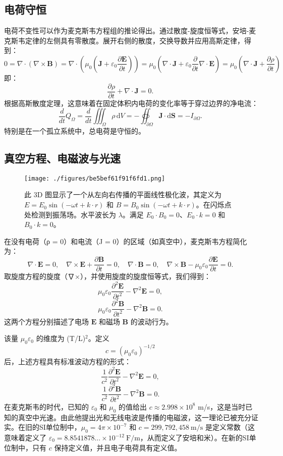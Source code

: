 \subsection{电荷守恒}
电荷不变性可以作为麦克斯韦方程组的推论得出。通过散度-旋度恒等式，安培-麦克斯韦定律的左侧具有零散度。展开右侧的散度，交换导数并应用高斯定律，得到：
\[ 0 = \nabla \cdot (\nabla \times \mathbf{B}) = \nabla \cdot \left(\mu_{0} \left(\mathbf{J} + \varepsilon_{0} \frac{\partial \mathbf{E}}{\partial t}\right)\right) = \mu_{0} \left(\nabla \cdot \mathbf{J} + \varepsilon_{0} \frac{\partial}{\partial t} \nabla \cdot \mathbf{E}\right) = \mu_{0} \left(\nabla \cdot \mathbf{J} + \frac{\partial \rho}{\partial t}\right)~\]
即：
\[
\frac{\partial \rho}{\partial t} + \nabla \cdot \mathbf{J} = 0.~
\]
根据高斯散度定理，这意味着在固定体积内电荷的变化率等于穿过边界的净电流：
\[
\frac{d}{dt} Q_{\Omega} = \frac{d}{dt} \iiint_{\Omega} \rho \, \mathrm{d} V = -\oiint_{\partial \Omega} \mathbf{J} \cdot \mathrm{d} \mathbf{S} = -I_{\partial \Omega}.~
\]
特别是在一个孤立系统中，总电荷是守恒的。
\subsection{真空方程、电磁波与光速}  
\begin{figure}[ht]
\centering
\texttt{[image: ./figures/be5bef61f91f6fd1.png]}
\caption{此 3D 图显示了一个从左向右传播的平面线性极化波，其定义为 \(E = E_0 \sin(-\omega t + k \cdot r)\) 和 \(B = B_0 \sin(-\omega t + k \cdot r)\)。在闪烁点处检测到振荡场。水平波长为 \(\lambda\)。满足 \(E_0 \cdot B_0 = 0\)、\(E_0 \cdot k = 0\) 和 \(B_0 \cdot k = 0\)。} \label{fig_MAXS_9}
\end{figure}
在没有电荷（ρ = 0）和电流（J = 0）的区域（如真空中），麦克斯韦方程简化为：
\[
\nabla \cdot \mathbf{E} = 0, \quad \nabla \times \mathbf{E} + \frac{\partial \mathbf{B}}{\partial t} = 0, \quad \nabla \cdot \mathbf{B} = 0, \quad \nabla \times \mathbf{B} - \mu_0 \varepsilon_0 \frac{\partial \mathbf{E}}{\partial t} = 0.~
\]
取旋度方程的旋度（∇×），并使用旋度的旋度恒等式，我们得到：
\[
\mu_0 \varepsilon_0 \frac{\partial^2 \mathbf{E}}{\partial t^2} - \nabla^2 \mathbf{E} = 0,~
\]
\[
\mu_0 \varepsilon_0 \frac{\partial^2 \mathbf{B}}{\partial t^2} - \nabla^2 \mathbf{B} = 0.~
\]
这两个方程分别描述了电场 \(\mathbf{E}\) 和磁场 \(\mathbf{B}\) 的波动行为。

该量 \(\mu_0 \varepsilon_0\) 的维度为 (T/L)\(^2\)。定义
\[
c = (\mu_0 \varepsilon_0)^{-1/2}~
\]
后，上述方程具有标准波动方程的形式：
\[
\frac{1}{c^2} \frac{\partial^2 \mathbf{E}}{\partial t^2} - \nabla^2 \mathbf{E} = 0,~
\]
\[
\frac{1}{c^2} \frac{\partial^2 \mathbf{B}}{\partial t^2} - \nabla^2 \mathbf{B} = 0.~
\]
在麦克斯韦的时代，已知的 \(\varepsilon_0\) 和 \(\mu_0\) 的值给出 \(c \approx 2.998 \times 10^8\) m/s，这是当时已知的真空中光速。由此他提出光和无线电波是传播的电磁波，这一理论已被充分证实。在旧的SI单位制中，\(\mu_0 = 4\pi \times 10^{-7}\) 和 \(c = 299,792,458~\text{m/s}\) 是定义常数（这意味着定义了 \(\varepsilon_0 = 8.8541878... \times 10^{-12}~\text{F/m}\)，从而定义了安培和米）。在新的SI单位制中，只有 \(c\) 保持定义值，并且电子电荷具有定义值。

